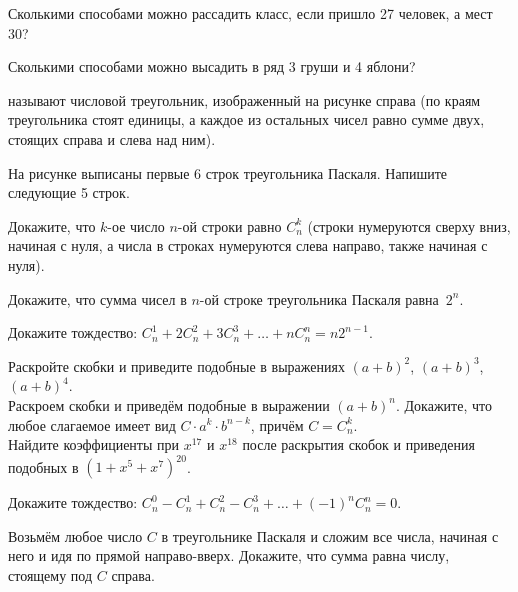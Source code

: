 \documentclass[12pt,a4paper]{article}
\begin{document}
 Сколькими способами можно рассадить класс,
если пришло 27 человек, а мест 30?

Сколькими способами можно высадить в ряд 3 груши и 4 яблони?

  называют числовой треугольник,
изображенный на рисунке справа (по краям треугольника стоят единицы,
а каждое из остальных чисел равно сумме двух, стоящих справа
и слева над ним).


На рисунке выписаны первые 6 строк треугольника Паскаля.
Напишите следующие 5 строк.

Докажите, что $k$-ое число $n$-ой строки равно $C_n^k$
(строки нумеруются сверху вниз, начиная с нуля,
а числа в строках нумеруются слева направо, также начиная с нуля).

Докажите, что сумма чисел в $n$-ой строке треугольника Паскаля
равна~$2^n$.

Докажите тождество:
$C_n^1+2C_n^2+3C_n^3+\ldots+nC_n^n=n2^{n-1}$.

 Раскройте скобки и приведите подобные в выражениях
$(a+b)^2$, $(a+b)^3$, $(a+b)^4$.\\
 Раскроем скобки и приведём подобные
в выражении $(a+b)^n$. Докажите, что любое слагаемое имеет вид $C\cdot a^k\cdot b^{n-k}$, причём $C=C_n^k$.\\
Найдите коэффициенты при $x^{17}$ и $x^{18}$ после раскрытия
скобок и приведения подобных в $(1+x^5+x^7)^{20}$.

Докажите тождество: $C_n^0-C_n^1+C_n^2-C_n^3+\ldots+(-1)^nC_n^n=0$.

Возьмём любое число $C$ в треугольнике Паскаля и сложим все
числа, начиная с него и идя по прямой направо-вверх.
Докажите, что сумма равна числу, стоящему под $C$ справа.
\end{document}
